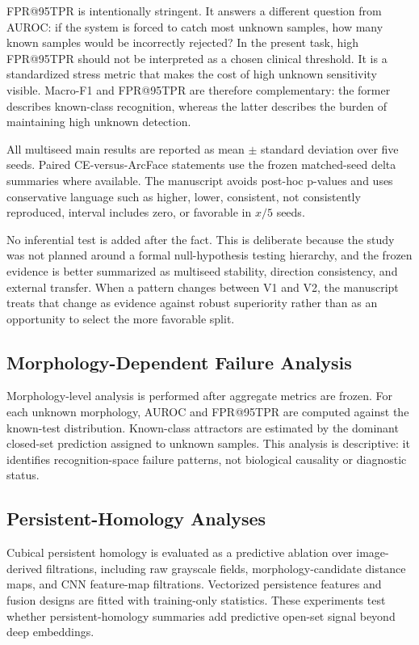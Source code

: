 FPR@95TPR is intentionally stringent. It answers a different question from AUROC: if the system is forced to catch most unknown samples, how many known samples would be incorrectly rejected? In the present task, high FPR@95TPR should not be interpreted as a chosen clinical threshold. It is a standardized stress metric that makes the cost of high unknown sensitivity visible. Macro-F1 and FPR@95TPR are therefore complementary: the former describes known-class recognition, whereas the latter describes the burden of maintaining high unknown detection.

All multiseed main results are reported as mean $\pm$ standard deviation over five seeds. Paired CE-versus-ArcFace statements use the frozen matched-seed delta summaries where available. The manuscript avoids post-hoc p-values and uses conservative language such as higher, lower, consistent, not consistently reproduced, interval includes zero, or favorable in $x/5$ seeds.

No inferential test is added after the fact. This is deliberate because the study was not planned around a formal null-hypothesis testing hierarchy, and the frozen evidence is better summarized as multiseed stability, direction consistency, and external transfer. When a pattern changes between V1 and V2, the manuscript treats that change as evidence against robust superiority rather than as an opportunity to select the more favorable split.

\subsection{Morphology-Dependent Failure Analysis}

Morphology-level analysis is performed after aggregate metrics are frozen. For each unknown morphology, AUROC and FPR@95TPR are computed against the known-test distribution. Known-class attractors are estimated by the dominant closed-set prediction assigned to unknown samples. This analysis is descriptive: it identifies recognition-space failure patterns, not biological causality or diagnostic status.

\subsection{Persistent-Homology Analyses}

Cubical persistent homology is evaluated as a predictive ablation over image-derived filtrations, including raw grayscale fields, morphology-candidate distance maps, and CNN feature-map filtrations. Vectorized persistence features and fusion designs are fitted with training-only statistics. These experiments test whether persistent-homology summaries add predictive open-set signal beyond deep embeddings.

